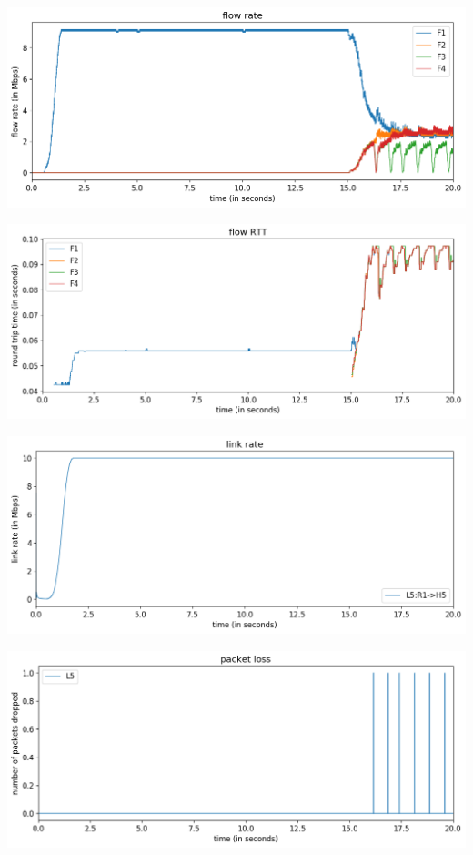 \documentclass{article}
\begin{document}
\includegraphics[width = \textwidth]{"test_case5_fast flow rate"}

\includegraphics[width = \textwidth]{"test_case5_fast flow RTT"}

\includegraphics[width = \textwidth]{"test_case5_fast link rate"}

\includegraphics[width = \textwidth]{"test_case5_fast packet loss"}
\end{document}
